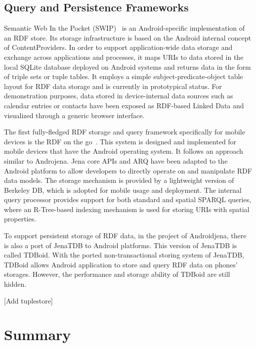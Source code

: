 \subsection{Query and Persistence Frameworks}
Semantic Web In the Pocket (SWIP)~\cite{DavidJerome:2010} is an Android-specific implementation of an RDF store. Its storage infrastructure is based on the Android internal concept of ContentProviders. In order to support application-wide data storage and exchange across applications and processes, it maps URIs to data stored in the local SQLite database deployed on Android systems and returns data in the form of triple sets or tuple tables. It employs a simple subject-predicate-object table layout for RDF data storage and is currently in prototypical status. For demonstration purposes, data stored in device-internal data sources such as calendar entries or contacts have been exposed as RDF-based Linked Data and visualized through a generic browser
interface.

The first fully-fledged RDF storage and query framework specifically for mobile devices is the RDF on the go~\cite{Danh:2010}. This system is designed and implemented for mobile devices that have the Android operating system. It follows an approach similar to Androjena. Jena core APIs and ARQ have been adapted to the Android platform to allow developers to directly operate on and manipulate RDF data models. The storage mechanism is provided by a lightweight version of Berkeley DB, which is adopted for mobile usage and deployment. The internal query processor provides support for both standard and spatial SPARQL queries, where an R-Tree-based indexing mechanism is used for storing URIs with spatial properties. 

To support persistent storage of RDF data, in the project of Androidjena, there is also a port of JenaTDB to Android platforms. This version of JenaTDB is called TDBoid. With the ported non-transactional storing system of JenaTDB, TDBoid allows Android application to store and query RDF data on phones' storages. However, the performance and storage ability of TDBoid are still hidden. 


[Add tuplestore]

\section{Summary}
